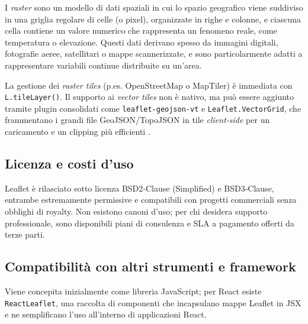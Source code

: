 I \textit{raster} sono un modello di dati spaziali in cui lo spazio geografico viene suddiviso in una griglia regolare di celle (o pixel), organizzate in righe e colonne, e ciascuna cella contiene un valore numerico che rappresenta un fenomeno reale, come temperatura o elevazione. Questi dati derivano spesso da immagini digitali, fotografie aeree, satellitari o mappe scannerizzate, e sono particolarmente adatti a rappresentare variabili continue distribuite su un'area. \cite{esri-raster-model,qgis-raster-data}

La gestione dei \emph{raster tiles} (p.es. OpenStreetMap o MapTiler) è immediata con \texttt{L.tileLayer()}\cite{maptiler-raster}.  
Il supporto ai \emph{vector tiles} non è nativo, ma può essere aggiunto tramite plugin consolidati come \texttt{leaflet-geojson-vt} e \texttt{Leaflet.VectorGrid}, che frammentano i grandi file GeoJSON/TopoJSON in tile \textit{client‑side} per un caricamento e un clipping più efficienti \cite{leaflet-geojson-vt,vectorgrid}.  

\subsection{Licenza e costi d'uso}  
Leaflet è rilasciato sotto licenza BSD2‑Clause (Simplified) e BSD3‑Clause, entrambe estremamente permissive e compatibili con progetti commerciali senza obblighi di royalty.
Non esistono canoni d'uso; per chi desidera supporto professionale, sono disponibili piani di consulenza e SLA a pagamento offerti da terze parti. \cite{leaflet-doc, leaflet-license}

\subsection{Compatibilità con altri strumenti e framework}  
Viene concepita inizialmente come libreria JavaScript; per React esiste \texttt{ReactLeaflet}, una raccolta di componenti che incapsulano mappe Leaflet in JSX e ne semplificano l'uso all'interno di applicazioni React. \cite{react-leaflet}

\newpage